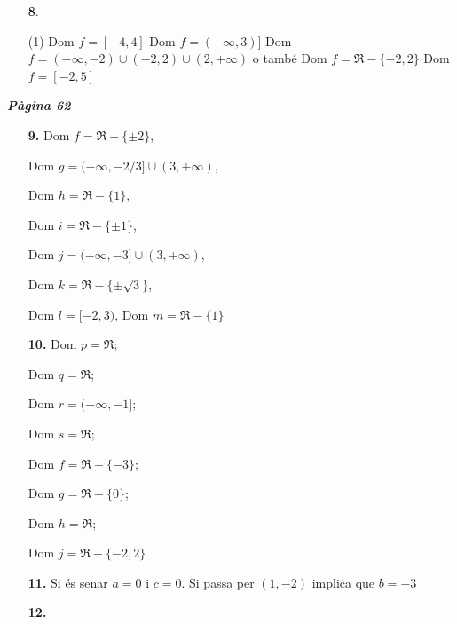 \documentclass[a4paper, pdf, twoside]{book}
\begin{document}
\begin{multicols}{2}
\begin{enumerate}

 \item[\fontfamily{phv}\selectfont\color{blue}\textbf{8}. ] 
 \begin{tasks}[column-sep=1em, item-indent=1.3333em](1)
	 \task Dom $f=[-4,4]$
	 \task Dom $f=(-\infty ,3)]$
	 \task Dom $f=(-\infty ,-2)\cup (-2,2)\cup (2,+\infty )$ o també Dom $f=\Re -\{-2,2\}$
	 \task Dom $f=[-2,5]$
\end{tasks}
 \end{enumerate}
\vspace{0.3cm}


{\textbf{\em Pàgina 62}} \hrulefill
\begin{enumerate}
\vspace{0.25cm}
\item[\fontfamily{phv}\selectfont\color{blue}\textbf{9. }]  \scalebox{0.6}{\simbolclau } 
$\text {Dom }f=\Re -\{\pm 2\}$,\par $\text {Dom } g=(-\infty ,-2/3]\cup (3,+\infty )$,\par $\text {Dom } h=\Re -\{1\}$,\par $\text {Dom } i=\Re -\{\pm 1\}$,\par $\text {Dom } j=(-\infty ,-3]\cup (3,+\infty )$,\par $\text {Dom } k=\Re -\{\pm \sqrt {3}\}$,\par $\text {Dom } l=[-2,3)$, $\text {Dom } m=\Re - \{1\}$
 \end{enumerate}
\begin{enumerate}
\vspace{0.25cm}
\item[\fontfamily{phv}\selectfont\color{blue}\textbf{10. }] 
Dom $p=\Re $;\par Dom $q=\Re $;\par Dom $r=(-\infty ,-1]$;\par Dom $s=\Re $;\par Dom $f=\Re -\{-3\}$;\par Dom $g=\Re -\{0\}$;\par Dom $h=\Re $;\par Dom $j=\Re -\{-2,2\}$ 
\vspace{0.25cm}
\item[\fontfamily{phv}\selectfont\color{blue}\textbf{11. }] 
Si és senar $a=0$ i $c=0$. Si passa per $(1,-2)$ implica que $b=-3$
\vspace{0.25cm}
\item[\fontfamily{phv}\selectfont\color{blue}\textbf{12. }] 

\end{enumerate}
\end{multicols}
\end{document}
